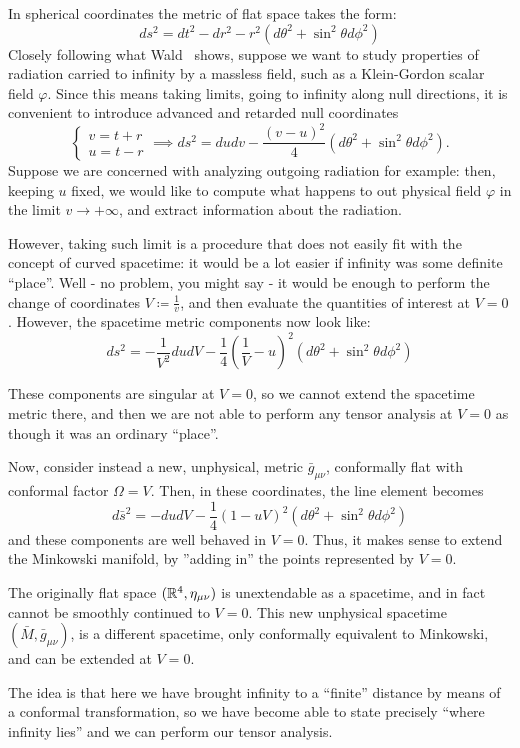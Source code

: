 In spherical coordinates the metric of flat space takes the form:
\[
ds^2 = dt^2 - dr^2 - r^2(d\theta^2 + \sin^2\theta d\phi^2)
\]
Closely following what Wald~\cite{wald2010general} shows, suppose we want to study properties of radiation carried to infinity by a massless field, such as a Klein-Gordon scalar field \(\varphi\). Since this means taking limits, going to infinity along null directions, it is convenient to introduce advanced and retarded null coordinates
\[
\begin{cases}
	 v = t + r\\
	 u = t - r
\end{cases}
\implies 
ds^2 = dudv - \frac{(v - u)^2}{4}(d\theta^2 + \sin^2\theta d\phi^2).
\]
Suppose we are concerned with analyzing outgoing radiation for example: then, keeping \(u\) fixed, we would like to compute what happens to out physical field \(\varphi\) in the limit \(v \rightarrow +\infty\), and extract information about the radiation.

However, taking such limit is a procedure that does not easily fit with the concept of curved spacetime: it would be a lot easier if infinity was some definite ``place''. Well - no problem, you might say - it would be enough to perform the change of coordinates \(V\coloneqq \frac{1}{v}\), and then evaluate the quantities of interest at \(V = 0\). However, the spacetime metric components now look like:
\[
ds^2 = -\frac{1}{V^2}dudV - \frac{1}{4}\left(\frac{1}{V} - u\right)^2 (d\theta^2 + \sin^2\theta d\phi^2)
\]

These components are singular at \(V = 0\), so we cannot extend the spacetime metric there, and then we are not able to perform any tensor analysis at \(V = 0\) as though it was an ordinary ``place''. 

Now, consider instead a new, unphysical, metric \(\bar{g}_{\mu\nu}\), conformally flat with conformal factor \(\Omega = V\). Then, in these coordinates, the line element becomes
\[
d\bar{s}^2 = -dudV - \frac{1}{4}\left(1- uV\right)^2 (d\theta^2 + \sin^2\theta d\phi^2)
\]
and these components are well behaved in \(V = 0\). Thus, it makes sense to extend the Minkowski manifold, by ''adding in'' the points represented by \(V = 0\).
\begin{remark}
	The originally flat space \(({\mathbb{R}}^4, \eta_{\mu\nu})\) is unextendable as a spacetime, and in fact cannot be smoothly continued to \(V = 0\). This new unphysical spacetime \((\bar{M},\bar{g}_{\mu\nu} )\), is a different spacetime, only conformally equivalent to Minkowski, and can be extended at \(V = 0\).
\end{remark}
The idea is that here we have brought infinity to a ``finite'' distance by means of a conformal transformation, so we have become able to state precisely ``where infinity lies'' and we can perform our tensor analysis.


